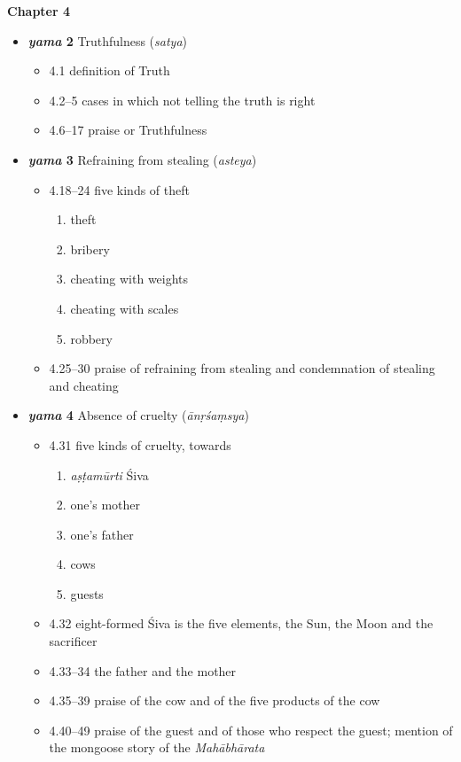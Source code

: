 \documentclass[11pt]{book} %
\newcommand{\skt}[1]{\textit{#1}}
\begin{document}
\pagebreak

 \textbf{Chapter 4}
\begin{itemize}
\item \textbf{\skt{yama} 2}  Truthfulness (\skt{satya})
   \begin{itemize}
  \item 4.1 definition of Truth
  \item 4.2--5 cases in which not telling the truth is right
  \item 4.6--17 praise or Truthfulness
  \end{itemize}

 \item \textbf{\skt{yama} 3}  Refraining from stealing (\skt{asteya})
  \begin{itemize}
  \item 4.18--24 five kinds of theft
  \begin{enumerate}
  \item theft 
  \item bribery
  \item cheating with weights
  \item cheating with scales
  \item robbery
  \end{enumerate}
  \item 4.25--30 praise of refraining from stealing and 
  condemnation of stealing and cheating
  \end{itemize}

\item \textbf{\skt{yama} 4}  Absence of cruelty (\skt{ānṛśaṃsya})
\begin{itemize}
\item 4.31 five kinds of cruelty, towards
  \begin{enumerate}
  \item  \skt{aṣṭamūrti} Śiva 
  \item  one's mother
  \item one's father
  \item cows
  \item guests
  \end{enumerate}
\item 4.32 eight-formed Śiva is the five elements, the Sun, the Moon and the sacrificer 
\item 4.33--34 the father and the mother
\item 4.35--39 praise of the cow and of the five products
     of the cow
\item 4.40--49 praise of the guest and of those who respect the guest;
   mention of the mongoose story of the \textit{Mahābhārata}
\end{itemize}


\end{itemize}
\end{document}
